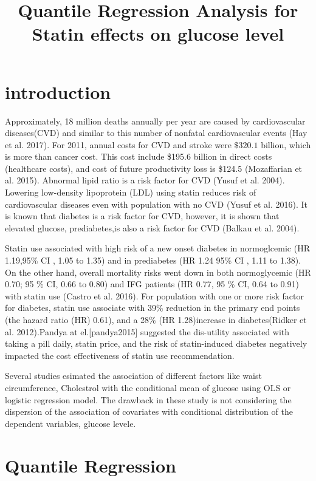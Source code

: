\documentclass[12pt,]{article}
\title{Quantile Regression Analysis for Statin effects on glucose level}
\author{}
\date{\vspace{-2.5em}}
\begin{document}
\maketitle

{
\setcounter{tocdepth}{2}
\tableofcontents
}
\section{introduction}

Approximately, 18 million deaths annually per year are caused by
cardiovascular diseases(CVD) and similar to this number of nonfatal
cardiovascular events (Hay et al. 2017). For 2011, annual costs for CVD
and stroke were \(\$320.1\) billion, which is more than cancer cost.
This cost include \$195.6 billion in direct costs (healthcare costs),
and cost of future productivity loss is \$124.5 (Mozaffarian et al.
2015). Abnormal lipid ratio is a risk factor for CVD (Yusuf et al.
2004). Lowering low-density lipoprotein (LDL) using statin reduces risk
of cardiovascular diseases even with population with no CVD (Yusuf et
al. 2016). It is known that diabetes is a risk factor for CVD, however,
it is shown that elevated glucose, prediabetes,is also a risk factor for
CVD (Balkau et al. 2004).

Statin use associated with high risk of a new onset diabetes in
normoglcemic (HR 1.19,95\% CI , 1.05 to 1.35) and in prediabetes (HR
1.24 95\% CI , 1.11 to 1.38). On the other hand, overall mortality risks
went down in both normoglycemic (HR 0.70; 95 \% CI, 0.66 to 0.80) and
IFG patients (HR 0.77, 95 \% CI, 0.64 to 0.91) with statin use (Castro
et al. 2016). For population with one or more risk factor for diabetes,
statin use associate with 39\% reduction in the primary end points (the
hazard ratio (HR) 0.61), and a 28\% (HR 1.28)increase in diabetes(Ridker
et al. 2012).Pandya at el.{[}pandya2015{]} suggested the dis-utility
associated with taking a pill daily, statin price, and the risk of
statin-induced diabetes negatively impacted the cost effectiveness of
statin use recommendation.

Several studies esimated the association of different factors like waist
circumference, Cholestrol with the conditional mean of glucose using OLS
or logistic regression model. The drawback in these study is not
considering the dispersion of the association of covariates with
conditional distribution of the dependent variables, glucose levele.

\section{Quantile Regression}
\end{document}
